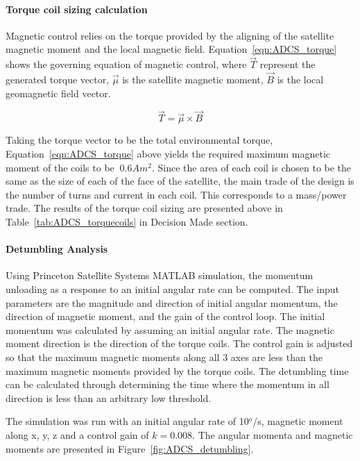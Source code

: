 \documentclass[12pt]{article}
\begin{document}
			\paragraph{Torque coil sizing calculation}
			Magnetic control relies on the torque provided by the aligning of the satellite magnetic moment and the local magnetic field. Equation~\ref{eqn:ADCS_torque} shows the governing equation of magnetic control, where $\vec{T}$ represent the generated torque vector, $\vec{\mu}$ is the satellite magnetic moment, $\vec{B}$ is the local geomagnetic field vector. 
			
			\begin{equation}
				\vec{T} = \vec{\mu} \times \vec{B}
				\label{eqn:ADCS_torque}
			\end{equation}
			
			Taking the torque vector to be the total environmental torque, Equation~\ref{eqn:ADCS_torque} above yields the required maximum magnetic moment of the coils to be $~ 0.6 Am^2$. Since the area of each coil is chosen to be the same as the size of each of the face of the satellite, the main trade of the design is the number of turns and current in each coil. This corresponds to a mass/power trade. The results of the torque coil sizing are presented above in Table~\ref{tab:ADCS_torquecoils} in Decision Made section. 
			
			\paragraph{Detumbling Analysis}
				Using Princeton Satellite Systems MATLAB simulation, the momentum unloading as a response to an initial angular rate can be computed. The input parameters are the magnitude and direction of initial angular momentum, the direction of magnetic moment, and the gain of the control loop. The initial momentum was calculated by assuming an initial angular rate. The magnetic moment direction is the direction of the torque coils. The control gain is adjusted so that the maximum magnetic moments along all 3 axes are less than the maximum magnetic moments provided by the torque coils. The detumbling time can be calculated through determining the time where the momentum in all direction is less than an arbitrary low threshold. 

The simulation was run with an initial angular rate of 10$^o$/s, magnetic moment along x, y, z and a control gain of $k =0.008$. The angular momenta and magnetic moments are presented in Figure~\ref{fig:ADCS_detumbling}.
			
\end{document}

